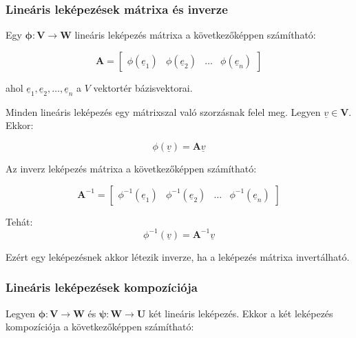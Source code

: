 \documentclass{article}
\begin{document}
\subsubsection{Lineáris leképezések mátrixa és inverze}

Egy $\mathbf{\phi : V \rightarrow W}$ lineáris leképezés mátrixa a következőképpen számítható:

\begin{equation*}
    \mathbf{A} = \begin{bmatrix} \phi(\underline{e}_1) & \phi(\underline{e}_2) & \ldots & \phi(\underline{e}_n) \end{bmatrix}
\end{equation*}

ahol $\underline{e}_1, \underline{e}_2, \ldots, \underline{e}_n$ a $V$ vektortér bázisvektorai.

\vspace{5mm}

Minden lineáris leképezés egy mátrixszal való szorzásnak felel meg. Legyen $\underline{v} \in \mathbf{V}$. Ekkor:

\begin{equation*}
    \phi(\underline{v}) = \mathbf{A}\underline{v}
\end{equation*}

Az inverz leképezés mátrixa a következőképpen számítható:

\begin{equation*}
    \mathbf{A}^{-1} = \begin{bmatrix} \phi^{-1}(\underline{e}_1) & \phi^{-1}(\underline{e}_2) & \ldots & \phi^{-1}(\underline{e}_n) \end{bmatrix} 
\end{equation*}

Tehát:
\begin{equation*}
    \phi^{-1}(\underline{v}) = \mathbf{A}^{-1}\underline{v}   
\end{equation*}

Ezért egy leképezésnek akkor létezik inverze, ha a leképezés mátrixa invertálható.

\subsubsection{Lineáris leképezések kompozíciója}

Legyen $\mathbf{\phi : V \rightarrow W}$ és $\mathbf{\psi : W \rightarrow U}$ két lineáris leképezés. Ekkor a két leképezés kompozíciója a következőképpen számítható:
\end{document}
